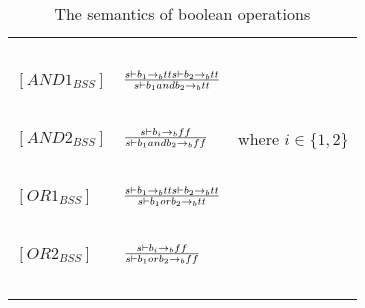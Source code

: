 \begin{table}[h]
\begin{tabular}{|l|l|l|}
			~			&															~																			& ~ \\
	$[AND1_{BSS}]$		& $s \vdash b_{1} \rightarrow_{b} tt  s \vdash b_{2} \rightarrow_{b} tt \over s \vdash b_{1} and b_{2} \rightarrow_{b} tt$				& ~ \\
			~			&															~																			& ~ \\
	$[AND2_{BSS}]$		& $s \vdash b_{i} \rightarrow_{b} ff \over s \vdash b_{1} and b_{2} \rightarrow_{b} ff$													& where $i \in \{1,2\}$ \\
			~			&															~																			& ~ \\
	$[OR1_{BSS}]$		& $s \vdash b_{1} \rightarrow_{b} tt  s \vdash b_{2} \rightarrow_{b} tt \over s \vdash b_{1} or b_{2} \rightarrow_{b} tt$				& ~ \\
			~			&															~																			& ~ \\
	$[OR2_{BSS}]$		& $s \vdash b_{i} \rightarrow_{b} ff \over s \vdash b_{1} or b_{2} \rightarrow_{b} ff$													& ~ \\
			~			&															~																			& ~ \\
	\hline
	\end{tabular}
	\label{tab:semantics_boolean}
	\caption{The semantics of boolean operations}
\end{table}

